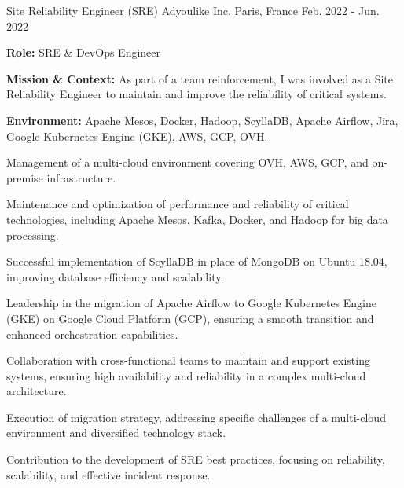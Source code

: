 \begin{cventries}
\cventry
{Site Reliability Engineer (SRE)} %
{Adyoulike Inc.} %
{Paris, France} %
{Feb. 2022 - Jun. 2022} %
{
  \begin{cvitems} %
    \item {\textbf{Role:} SRE \& DevOps Engineer}
    \item {\textbf{Mission \& Context:} As part of a team reinforcement, I was involved as a Site Reliability Engineer to maintain and improve the reliability of critical systems.}
    \item {\textbf{Environment:} Apache Mesos, Docker, Hadoop, ScyllaDB, Apache Airflow, Jira, Google Kubernetes Engine (GKE), AWS, GCP, OVH.}
    \item {Management of a multi-cloud environment covering OVH, AWS, GCP, and on-premise infrastructure.}
    \item {Maintenance and optimization of performance and reliability of critical technologies, including Apache Mesos, Kafka, Docker, and Hadoop for big data processing.}
    \item {Successful implementation of ScyllaDB in place of MongoDB on Ubuntu 18.04, improving database efficiency and scalability.}
    \item {Leadership in the migration of Apache Airflow to Google Kubernetes Engine (GKE) on Google Cloud Platform (GCP), ensuring a smooth transition and enhanced orchestration capabilities.}
    \item {Collaboration with cross-functional teams to maintain and support existing systems, ensuring high availability and reliability in a complex multi-cloud architecture.}
    \item {Execution of migration strategy, addressing specific challenges of a multi-cloud environment and diversified technology stack.}
    \item {Contribution to the development of SRE best practices, focusing on reliability, scalability, and effective incident response.}
  \end{cvitems}
}


\end{cventries}
